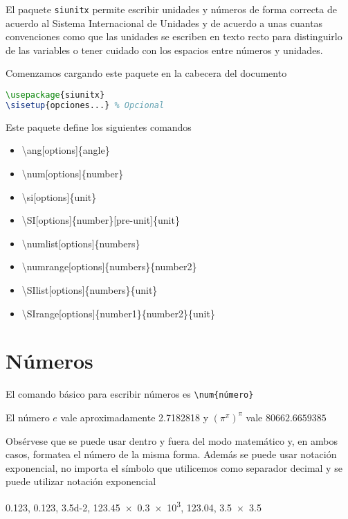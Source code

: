 \documentclass[11pt]{article}
\begin{document}
El paquete \texttt{siunitx} permite escribir unidades y números de forma correcta de acuerdo al Sistema Internacional de Unidades y de acuerdo a unas cuantas convenciones como que las unidades se escriben en texto recto para distinguirlo de las variables o tener cuidado con los espacios entre números y unidades.

Comenzamos cargando este paquete en la cabecera del documento
\begin{lstlisting}[language=tex]
\usepackage{siunitx}
\sisetup{opciones...} % Opcional
\end{lstlisting}

Este paquete define los siguientes comandos
\begin{itemize}
\item \textbackslash ang[options]\{angle\}
\item \textbackslash num[options]\{number\}
\item \textbackslash si[options]\{unit\}
\item \textbackslash SI[options]\{number\}[pre-unit]\{unit\} 
\item \textbackslash numlist[options]\{numbers\}
\item \textbackslash numrange[options]\{numbers\}\{number2\} 
\item \textbackslash SIlist[options]\{numbers\}\{unit\}
\item \textbackslash SIrange[options]\{number1\}\{number2\}\{unit\} 
\end{itemize}

\section{Números}

El comando básico para escribir números es \texttt{\textbackslash{}num\{número\}}
\begin{LTXexample}[pos=l,rframe={}]
El n\'umero $e$ vale aproximadamente \num{2.7182818} y $\left(\pi^\pi\right)^{\pi}$ vale $\num{80662.6659385}$
\end{LTXexample}
Obsérvese que se puede usar dentro y fuera del modo matemático y, en ambos casos, formatea el número de la misma forma. Además se puede usar notación exponencial, no importa el símbolo que utilicemos como separador decimal y se puede utilizar notación exponencial
\begin{LTXexample}[pos=l,rframe={}]
\num{0.123}, \num{.123}, \num{3.5d-2}, \num{123.45 x .3e3}, \num{123.04}, \num{3,5x3.5}
\end{LTXexample}
\end{document}
